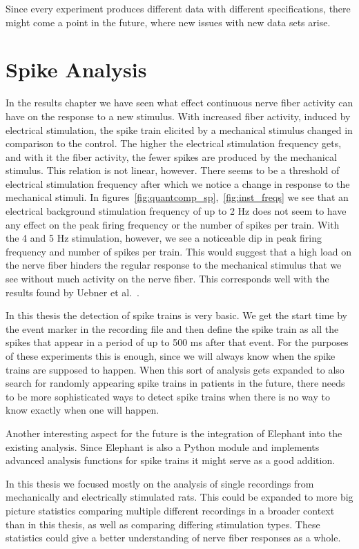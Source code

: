 Since every experiment produces different data with different specifications, there might come a point in the future, where new issues with new data sets arise.

\section{Spike Analysis}
In the results chapter we have seen what effect continuous nerve fiber activity can have on the response to a new stimulus. With increased fiber activity, induced by electrical stimulation, the spike train elicited by a mechanical stimulus changed in comparison to the control. The higher the electrical stimulation frequency gets, and with it the fiber activity, the fewer spikes are produced by the mechanical stimulus. This relation is not linear, however. There seems to be a threshold of electrical stimulation frequency after which we notice a change in response to the mechanical stimuli. In figures~\ref{fig:quantcomp_sp},~\ref{fig:inst_freqs} we see that an electrical background stimulation frequency of up to 2 Hz does not seem to have any effect on the peak firing frequency or the number of spikes per train. With the 4 and 5 Hz stimulation, however, we see a noticeable dip in peak firing frequency and number of spikes per train. This would suggest that a high load on the nerve fiber hinders the regular response to the mechanical stimulus that we see without much activity on the nerve fiber. This corresponds well with the results found by Uebner et al.~\cite{roberto}.

In this thesis the detection of spike trains is very basic. We get the start time by the event marker in the recording file and then define the spike train as all the spikes that appear in a period of up to 500 ms after that event. For the purposes of these experiments this is enough, since we will always know when the spike trains are supposed to happen. When this sort of analysis gets expanded to also search for randomly appearing spike trains in patients in the future, there needs to be more sophisticated ways to detect spike trains when there is no way to know exactly when one will happen.

Another interesting aspect for the future is the integration of Elephant into the existing analysis. Since Elephant is also a Python module and implements advanced analysis functions for spike trains it might serve as a good addition. 

In this thesis we focused mostly on the analysis of single recordings from mechanically and electrically stimulated rats. This could be expanded to more big picture statistics comparing multiple different recordings in a broader context than in this thesis, as well as comparing differing stimulation types. These statistics could give a better understanding of nerve fiber responses as a whole.





\cleardoublepage
